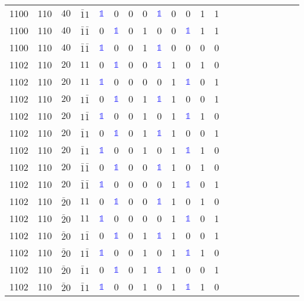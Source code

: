 \begin{longtable*}{c| cccccccccccccccccccc }
1100& 110& $40$& $\bar{1}1$& \textcolor{blue}{$\mathds{1}$}& 0& 0& 0& \textcolor{blue}{$\mathds{1}$}& 0& 0& 1& 1\\
1100& 110& $40$& $\bar{1}\bar{1}$& 0& \textcolor{blue}{$\mathds{1}$}& 0& 1& 0& 0& \textcolor{blue}{$\mathds{1}$}& 1& 1\\
1100& 110& $40$& $\bar{1}\bar{1}$& \textcolor{blue}{$\mathds{1}$}& 0& 0& 1& \textcolor{blue}{$\mathds{1}$}& 0& 0& 0& 0\\
1102& 110& $20$& $11$& 0& \textcolor{blue}{$\mathds{1}$}& 0& 0& \textcolor{blue}{$\mathds{1}$}& 1& 0& 1& 0\\
1102& 110& $20$& $11$& \textcolor{blue}{$\mathds{1}$}& 0& 0& 0& 0& 1& \textcolor{blue}{$\mathds{1}$}& 0& 1\\
1102& 110& $20$& $1\bar{1}$& 0& \textcolor{blue}{$\mathds{1}$}& 0& 1& \textcolor{blue}{$\mathds{1}$}& 1& 0& 0& 1\\
1102& 110& $20$& $1\bar{1}$& \textcolor{blue}{$\mathds{1}$}& 0& 0& 1& 0& 1& \textcolor{blue}{$\mathds{1}$}& 1& 0\\
1102& 110& $20$& $\bar{1}1$& 0& \textcolor{blue}{$\mathds{1}$}& 0& 1& \textcolor{blue}{$\mathds{1}$}& 1& 0& 0& 1\\
1102& 110& $20$& $\bar{1}1$& \textcolor{blue}{$\mathds{1}$}& 0& 0& 1& 0& 1& \textcolor{blue}{$\mathds{1}$}& 1& 0\\
1102& 110& $20$& $\bar{1}\bar{1}$& 0& \textcolor{blue}{$\mathds{1}$}& 0& 0& \textcolor{blue}{$\mathds{1}$}& 1& 0& 1& 0\\
1102& 110& $20$& $\bar{1}\bar{1}$& \textcolor{blue}{$\mathds{1}$}& 0& 0& 0& 0& 1& \textcolor{blue}{$\mathds{1}$}& 0& 1\\
1102& 110& $\bar{2}0$& $11$& 0& \textcolor{blue}{$\mathds{1}$}& 0& 0& \textcolor{blue}{$\mathds{1}$}& 1& 0& 1& 0\\
1102& 110& $\bar{2}0$& $11$& \textcolor{blue}{$\mathds{1}$}& 0& 0& 0& 0& 1& \textcolor{blue}{$\mathds{1}$}& 0& 1\\
1102& 110& $\bar{2}0$& $1\bar{1}$& 0& \textcolor{blue}{$\mathds{1}$}& 0& 1& \textcolor{blue}{$\mathds{1}$}& 1& 0& 0& 1\\
1102& 110& $\bar{2}0$& $1\bar{1}$& \textcolor{blue}{$\mathds{1}$}& 0& 0& 1& 0& 1& \textcolor{blue}{$\mathds{1}$}& 1& 0\\
1102& 110& $\bar{2}0$& $\bar{1}1$& 0& \textcolor{blue}{$\mathds{1}$}& 0& 1& \textcolor{blue}{$\mathds{1}$}& 1& 0& 0& 1\\
1102& 110& $\bar{2}0$& $\bar{1}1$& \textcolor{blue}{$\mathds{1}$}& 0& 0& 1& 0& 1& \textcolor{blue}{$\mathds{1}$}& 1& 0\\

\end{longtable*}
